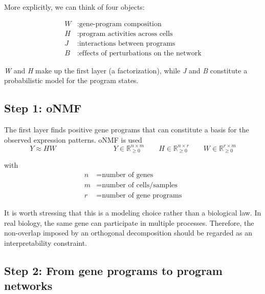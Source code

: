 \documentclass[11pt,a4paper]{article}
\newcommand\identity{1\kern-0.25em\text{l}}
\begin{document}
\noindent More explicitly, we can think of four objects:

\begin{align*}
W &: \text{gene-program composition}\\
H &: \text{program activities across cells}\\
J &: \text{interactions between programs}\\
B &: \text{effects of perturbations on the network}
\end{align*}

\textit{W} and \textit{H} make up the first layer (a factorization), while \textit{J} and \textit{B} constitute a probabilistic model for the program states.

\subsection{Step 1: oNMF}

The first layer finds positive gene programs that can constitute a basis for the observed expression patterns. oNMF is used
\[
Y \approx HW
\qquad \qquad \qquad \qquad 
Y \in \mathbb{R}_{\geq 0}^{n\times m}
\qquad 
H\in\mathbb{R}_{\geq0}^{n\times r}
\qquad
W\in\mathbb{R}_{\geq0}^{r\times m}
\]

with 
\begin{align*}
n &= \text{number of genes} \\
m &= \text{number of cells/samples} \\
r &= \text{number of gene programs} 
\end{align*}

%

It is worth stressing that this is a modeling choice rather than a biological law. In real biology, the same gene can participate in multiple processes. Therefore, the non-overlap imposed by an orthogonal decomposition should be regarded as an interpretability constraint.


\subsection{Step 2: From gene programs to program networks}
\end{document}
